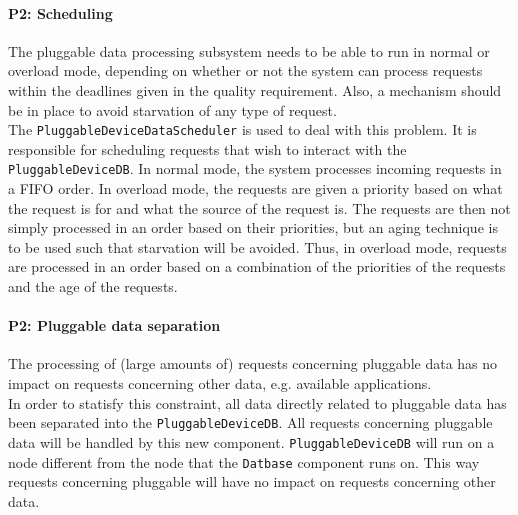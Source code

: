     \paragraph{P2: Scheduling}
        The pluggable data processing subsystem needs to be able to run in normal
        or overload mode, depending on whether or not the system can process
        requests within the deadlines given in the quality requirement. Also,
        a mechanism should be in place to avoid starvation of any type of request. \\
        The \texttt{PluggableDeviceDataScheduler} is used to deal with this problem.
        It is responsible for scheduling requests that wish to interact with
        the \texttt{PluggableDeviceDB}. In normal mode, the system processes
        incoming requests in a FIFO order. In overload mode, the requests are
        given a priority based on what the request is for and what the source
        of the request is. The requests are then not simply processed in an
        order based on their priorities, but an aging technique is to be used
        such that starvation will be avoided. Thus, in overload mode,
        requests are processed in an order based on a combination of the
        priorities of the requests and the age of the requests.

    \paragraph{P2: Pluggable data separation}
        The processing of (large amounts of) requests concerning pluggable
        data has no impact on requests concerning other data, e.g. available applications. \\
        In order to statisfy this constraint, all data directly related to
        pluggable data has been separated into the \texttt{PluggableDeviceDB}.
        All requests concerning pluggable data will be handled by this new
        component. \texttt{PluggableDeviceDB} will run on a node different
        from the node that the \texttt{Datbase} component runs on. This way
        requests concerning pluggable will have no impact on
        requests concerning other data.

